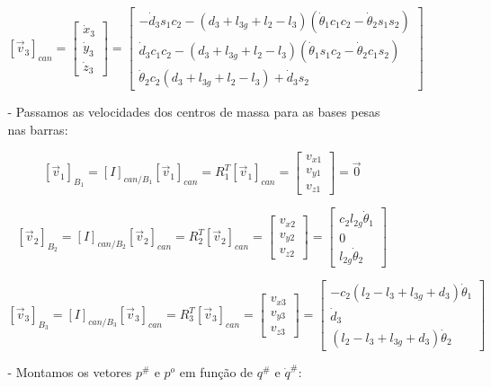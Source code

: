 \documentclass[12pt,a4paper]{article}
\begin{document}
\begin{itemize}
\begin{itemize}
\begin{itemize}
$$
[\vec{v}_3]_{can} =
\begin{bmatrix}
\dot{x}_3 \\
\dot{y}_3 \\
\dot{z}_3
\end{bmatrix}
=
\begin{bmatrix}
-\dot{d}_3 s_1 c_2 - (d_3 + l_{3g} + l_2 - l_3)(\dot{\theta}_1 c_1 c_2 - \dot{\theta}_2 s_1 s_2) \\
\dot{d}_3 c_1 c_2 - (d_3 + l_{3g} + l_2 - l_3)(\dot{\theta}_1 s_1 c_2 - \dot{\theta}_2 c_1 s_2) \\
\dot{\theta}_2 c_2 (d_3 + l_{3g} + l_2 - l_3) + \dot{d}_3 s_2
\end{bmatrix}
$$

\item[-] Passamos as velocidades dos centros de massa para as bases pesas nas barras:

$$
[\vec{v}_1]_{B_1} = [I]_{can/B_1} [\vec{v}_1]_{can} = R_1^T [\vec{v}_1]_{can} = 
\begin{bmatrix}
v_{x1} \\
v_{y1} \\
v_{z1} 
\end{bmatrix}
= \vec{0}
$$

$$
[\vec{v}_2]_{B_2} = [I]_{can/B_2} [\vec{v}_2]_{can} = R_2^T [\vec{v}_2]_{can} =
\begin{bmatrix}
v_{x2} \\
v_{y2} \\
v_{z2} 
\end{bmatrix}
=
\begin{bmatrix}
c_2 l_{2g} \dot{\theta}_1  \\
0 \\
l_{2g} \dot{\theta}_2
\end{bmatrix}
$$

$$
[\vec{v}_3]_{B_3} = [I]_{can/B_3} [\vec{v}_3]_{can} = R_3^T [\vec{v}_3]_{can} =
\begin{bmatrix}
v_{x3} \\
v_{y3} \\
v_{z3} 
\end{bmatrix}
=
\begin{bmatrix}
-c_2 (l_2 - l_3 + l_{3g} + d_3) \dot{\theta}_1 \\
\dot{d}_3 \\
(l_2 - l_3 + l_{3g} + d_3) \dot{\theta}_2
\end{bmatrix}
$$

\item[-] Montamos os vetores $p^{\#}$ e $p^o$ em função de $q^{\#}$ e $\dot{q}^{\#}$:


\end{itemize}
\end{itemize}
\end{itemize}
\end{document}

